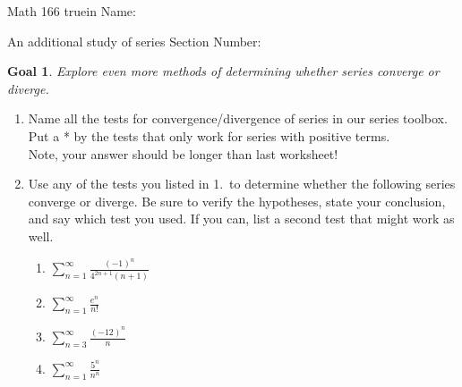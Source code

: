 \documentclass[12pt]{article}
\newtheorem*{goal}{Goal}
\begin{document}
\pagestyle{empty} %



\noindent
{Math 166  truein  Name:\ \hrulefill}

\noindent
{An additional study of series}
\noindent \hspace{2.5in} Section Number: \hrulefill
\bigskip

\begin{goal} \rm
Explore even more methods of determining whether series converge or diverge. 
\end{goal}

\begin{enumerate}
\item Name all the tests for convergence/divergence of series in our series toolbox. Put a * by the tests that only work for series with positive terms.\\ Note, your answer should be longer than last worksheet!
\vspace{1in}

\item Use any of the tests you listed in 1.\ to determine whether the following series converge or diverge. Be sure to verify the hypotheses, state your conclusion, and say which test you used. If you can, list a second test that might work as well.
\begin{enumerate}
\item $\displaystyle\sum_{n=1}^\infty \frac{(-1)^n}{4^{2n+1}(n+1)}$

\vfill


\item $\displaystyle\sum_{n=1}^{\infty} \frac{e^n}{n!}$

\vfill
\item $\displaystyle\sum_{n=3}^\infty \frac{(-12)^n}{n}$

\vfill
\newpage

\item $\displaystyle\sum_{n=1}^{\infty} \frac{5^n}{n^n}$ 


\end{enumerate}
\end{enumerate}
\end{document}
